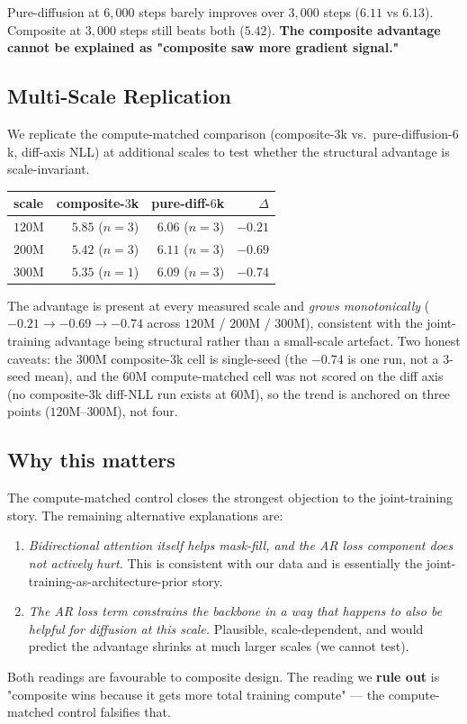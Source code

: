 Pure-diffusion at $6{,}000$ steps barely improves over $3{,}000$
steps ($6.11$ vs $6.13$). Composite at $3{,}000$ steps still beats
both ($5.42$). \textbf{The composite advantage cannot be explained as
"composite saw more gradient signal."}

\subsection{Multi-Scale Replication}

We replicate the compute-matched comparison (composite-$3$k vs.\
pure-diffusion-$6$k, diff-axis NLL) at additional scales to test
whether the structural advantage is scale-invariant.

\begin{center}
\begin{tabular}{lrrr}
\toprule
scale & composite-$3$k & pure-diff-$6$k & $\Delta$ \\
\midrule
$120$M & $5.85$ ($n{=}3$) & $6.06$ ($n{=}3$) & $\mathbf{-0.21}$ \\
$200$M & $5.42$ ($n{=}3$) & $6.11$ ($n{=}3$) & $\mathbf{-0.69}$ \\
$300$M & $5.35$ ($n{=}1$) & $6.09$ ($n{=}3$) & $\mathbf{-0.74}$ \\
\bottomrule
\end{tabular}
\end{center}

The advantage is present at every measured scale and \emph{grows
monotonically} ($-0.21 \to -0.69 \to -0.74$ across $120$M / $200$M /
$300$M), consistent with the joint-training advantage being structural
rather than a small-scale artefact. Two honest caveats: the $300$M
composite-$3$k cell is single-seed (the $-0.74$ is one run, not a
$3$-seed mean), and the $60$M compute-matched cell was not scored on
the diff axis (no composite-$3$k diff-NLL run exists at $60$M), so the
trend is anchored on three points ($120$M–$300$M), not four.

\subsection{Why this matters}

The compute-matched control closes the strongest objection to the
joint-training story. The remaining alternative explanations are:

\begin{enumerate}
  \item \emph{Bidirectional attention itself helps mask-fill, and
        the AR loss component does not actively hurt.} This is
        consistent with our data and is essentially the
        joint-training-as-architecture-prior story.
  \item \emph{The AR loss term constrains the backbone in a way that
        happens to also be helpful for diffusion at this scale.}
        Plausible, scale-dependent, and would predict the advantage
        shrinks at much larger scales (we cannot test).
\end{enumerate}

Both readings are favourable to composite design. The reading we
\textbf{rule out} is "composite wins because it gets more total
training compute" --- the compute-matched control falsifies that.

